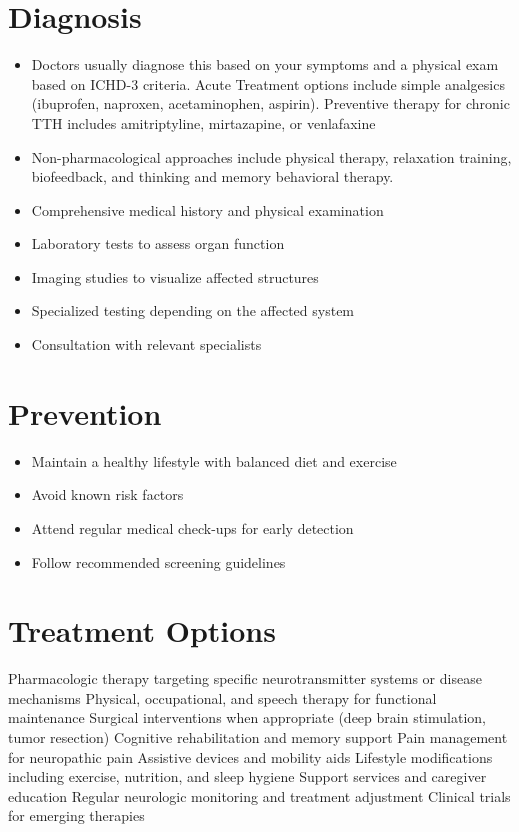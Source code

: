 \section{Diagnosis}
\begin{itemize}[noitemsep]
  \item Doctors usually diagnose this based on your symptoms and a physical exam based on ICHD-3 criteria. Acute Treatment options include simple analgesics (ibuprofen, naproxen, acetaminophen, aspirin). Preventive therapy for chronic TTH includes amitriptyline, mirtazapine, or venlafaxine
  \item Non-pharmacological approaches include physical therapy, relaxation training, biofeedback, and thinking and memory behavioral therapy.
  \item Comprehensive medical history and physical examination
  \item Laboratory tests to assess organ function
  \item Imaging studies to visualize affected structures
  \item Specialized testing depending on the affected system
  \item Consultation with relevant specialists
\end{itemize}
\section{Prevention}
\begin{itemize}[noitemsep]
  \item Maintain a healthy lifestyle with balanced diet and exercise
  \item Avoid known risk factors
  \item Attend regular medical check-ups for early detection
  \item Follow recommended screening guidelines
\end{itemize}
\section{Treatment Options}
Pharmacologic therapy targeting specific neurotransmitter systems or disease mechanisms Physical, occupational, and speech therapy for functional maintenance Surgical interventions when appropriate (deep brain stimulation, tumor resection) Cognitive rehabilitation and memory support Pain management for neuropathic pain Assistive devices and mobility aids Lifestyle modifications including exercise, nutrition, and sleep hygiene Support services and caregiver education Regular neurologic monitoring and treatment adjustment Clinical trials for emerging therapies

